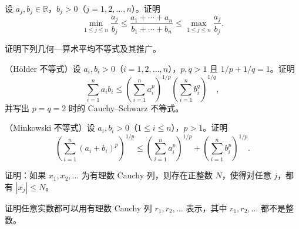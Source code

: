\noindent\begin{minipage}{\textwidth}
设 $a_j,b_j\in\mathbb R$，$b_j>0$（$j=1,2,\ldots,n$）。证明\[\min_{1\le j\le n}\frac{a_j}{b_j}\le\frac{a_1+\cdots+a_n}{b_1+\cdots+b_n}\le\max_{1\le j\le n}\frac{a_j}{b_j}.\]
\end{minipage}\par\vfill
\newpage
\noindent\begin{minipage}{\textwidth}
证明下列几何—算术平均不等式及其推广。
\end{minipage}\par\vfill
\newpage
\noindent\begin{minipage}{\textwidth}
（H\"older 不等式）设 $a_i,b_i>0$（$i=1,2,\ldots,n$），$p,q>1$ 且 $1/p+1/q=1$。证明\[\sum_{i=1}^{n}a_i b_i\le\left(\sum_{i=1}^{n}a_i^p\right)^{1/p}\left(\sum_{i=1}^{n}b_i^q\right)^{1/q},\]并写出 $p=q=2$ 时的 Cauchy--Schwarz 不等式。
\end{minipage}\par\vfill
\noindent\begin{minipage}{\textwidth}
（Minkowski 不等式）设 $a_i,b_i>0$（$1\le i\le n$），$p>1$。证明\[\left(\sum_{i=1}^{n}(a_i+b_i)^p\right)^{1/p}\le\left(\sum_{i=1}^{n}a_i^p\right)^{1/p}+\left(\sum_{i=1}^{n}b_i^p\right)^{1/p}.\]
\end{minipage}\par\vfill
\noindent\begin{minipage}{\textwidth}
证明：如果 $x_1,x_2,\ldots$ 为有理数 Cauchy 列，则存在正整数 $N$，使得对任意 $j$，都有 $|x_j|\le N$。
\end{minipage}\par\vfill
\noindent\begin{minipage}{\textwidth}
证明任意实数都可以用有理数 Cauchy 列 $r_1,r_2,\ldots$ 表示，其中 $r_1,r_2,\ldots$ 都不是整数。
\end{minipage}\par\vfill
